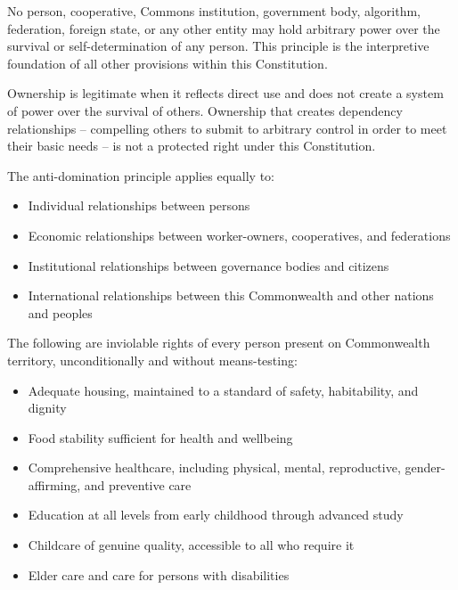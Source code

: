 


No person, cooperative, Commons institution, government body, algorithm, federation, foreign state, or any other entity may hold arbitrary power over the survival or self-determination of any person. This principle is the interpretive foundation of all other provisions within this Constitution.

Ownership is legitimate when it reflects direct use and does not create a system of power over the survival of others. Ownership that creates dependency relationships -- compelling others to submit to arbitrary control in order to meet their basic needs -- is not a protected right under this Constitution.

The anti-domination principle applies equally to:
\begin{itemize}
  \item Individual relationships between persons
  \item Economic relationships between worker-owners, cooperatives, and federations
  \item Institutional relationships between governance bodies and citizens
  \item International relationships between this Commonwealth and other nations and peoples
\end{itemize}


The following are inviolable rights of every person present on Commonwealth territory, unconditionally and without means-testing:
\begin{itemize}
  \item Adequate housing, maintained to a standard of safety, habitability, and dignity
  \item Food stability sufficient for health and wellbeing
  \item Comprehensive healthcare, including physical, mental, reproductive, gender-affirming, and preventive care
  \item Education at all levels from early childhood through advanced study
  \item Childcare of genuine quality, accessible to all who require it
  \item Elder care and care for persons with disabilities
\end{itemize}

